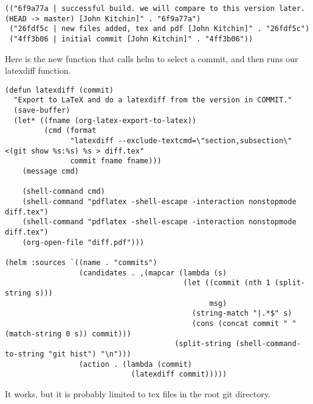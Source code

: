\documentclass[11pt]{article}
\begin{document}
\begin{verbatim}
(("6f9a77a | successful build. we will compare to this version later. (HEAD -> master) [John Kitchin]" . "6f9a77a")
 ("26fdf5c | new files added, tex and pdf [John Kitchin]" . "26fdf5c")
 ("4ff3b06 | initial commit [John Kitchin]" . "4ff3b06"))
\end{verbatim}

Here is the new function that calls helm to select a commit, and then runs our latexdiff function.

\begin{verbatim}
(defun latexdiff (commit)
  "Export to LaTeX and do a latexdiff from the version in COMMIT."
  (save-buffer)
  (let* ((fname (org-latex-export-to-latex))
         (cmd (format
               "latexdiff --exclude-textcmd=\"section,subsection\" <(git show %s:%s) %s > diff.tex"
               commit fname fname)))
    (message cmd)

    (shell-command cmd)
    (shell-command "pdflatex -shell-escape -interaction nonstopmode diff.tex")
    (shell-command "pdflatex -shell-escape -interaction nonstopmode diff.tex")
    (org-open-file "diff.pdf")))

(helm :sources `((name . "commits")
                 (candidates . ,(mapcar (lambda (s)
                                         (let ((commit (nth 1 (split-string s)))
                                               msg)
                                           (string-match "|.*$" s)
                                           (cons (concat commit " " (match-string 0 s)) commit)))
                                       (split-string (shell-command-to-string "git hist") "\n")))
                 (action . (lambda (commit)
                             (latexdiff commit)))))
\end{verbatim}

It works, but it is probably limited to tex files in the root git directory.
\end{document}
